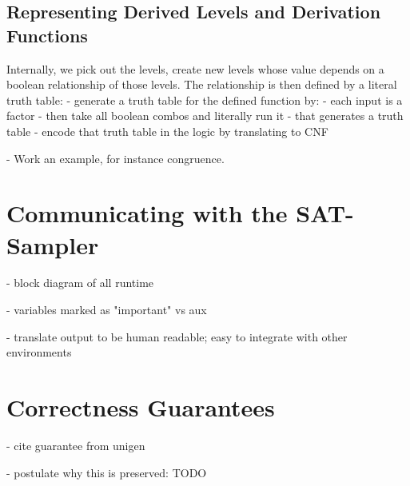 \subsection{Representing Derived Levels and Derivation Functions}

Internally, we pick out the levels, create new levels whose value depends on a boolean relationship of those levels. The relationship is then defined by a literal truth table:
- generate a truth table for the defined function by:
- each input is a factor
- then take all boolean combos and literally run it
- that generates a truth table
- encode that truth table in the logic by translating to CNF

- Work an example, for instance congruence.

\section{Communicating with the SAT-Sampler}

- block diagram of all runtime

- variables marked as "important" vs aux

- translate output to be human readable; easy to integrate with other environments


\section{Correctness Guarantees}

- cite guarantee from unigen

- postulate why this is preserved: TODO
